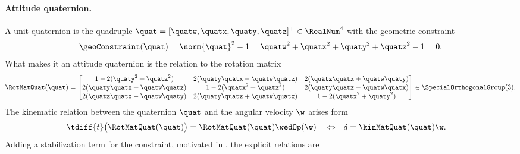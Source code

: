 \paragraph{Attitude quaternion.}
A unit quaternion is the quadruple $\quat = [\quatw, \quatx, \quaty, \quatz]^\top \in \RealNum^4$ with the geometric constraint 
\begin{align}
 \geoConstraint(\quat) = \norm{\quat}^2 - 1 = \quatw^2 + \quatx^2 + \quaty^2 + \quatz^2 - 1 = 0.
\end{align}
What makes it an attitude quaternion is the relation to the rotation matrix
\begin{align}
 \RotMatQuat(\quat) =
 \begin{bmatrix} 
  1 - 2(\quaty^{2} + \quatz^{2}) & 2(\quaty\quatx -\quatw\quatz)  & 2(\quatz\quatx + \quatw\quaty) \\
  2(\quaty\quatx + \quatw\quatz) & 1 - 2(\quatx^{2} + \quatz^{2}) & 2(\quaty\quatz - \quatw\quatx) \\
  2(\quatz\quatx - \quatw\quaty) & 2(\quaty\quatz + \quatw\quatx) & 1 - 2(\quatx^{2} + \quaty^{2})
 \end{bmatrix}
 \in \SpecialOrthogonalGroup(3)
 .
\end{align}
The kinematic relation between the quaternion $\quat$ and the angular velocity $\w$ arises form
\begin{align}
 \tdiff{t} \big( \RotMatQuat(\quat) \big) &= \RotMatQuat(\quat) \wedOp(\w)&
 &\Leftrightarrow&
 \dot{q} &= \kinMatQuat(\quat) \w.
\end{align}
Adding a stabilization term for the constraint, motivated in , the explicit relations are
